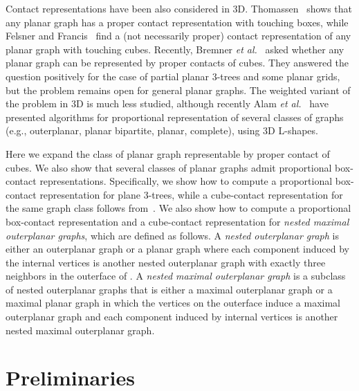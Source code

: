 \documentclass{llncs}
\begin{document}
Contact representations have been also considered in 3D. Thomassen~\cite{Thom88} shows that any planar graph has a proper
 contact representation with touching boxes, while Felsner and Francis~\cite{FF11} find
 a (not necessarily proper) contact representation of any planar graph with touching cubes.
 Recently, Bremner \textit{et al.}~\cite{BEF+12} asked whether any planar graph
 can be represented by proper contacts of cubes. They answered the question positively
 for the case of partial planar 3-trees and some planar grids, but the problem remains
 open for general planar graphs. The weighted variant of the problem
 in 3D is much less studied, although recently Alam \textit{et al.}~\cite{AKLPV14} have
 presented algorithms for proportional representation of several
 classes of graphs (e.g., outerplanar, planar bipartite, planar,
 complete), using 3D L-shapes.







 \smallskip{} Here we expand the class of planar graph representable by proper contact of cubes. We also
 show that several classes of planar graphs admit proportional box-contact representations.
Specifically, we show how to compute a proportional box-contact representation for plane 3-trees, while a cube-contact
 representation for the same graph class follows
 from~\cite{BEF+12}. We also show how to compute a proportional
 box-contact representation and a cube-contact representation for {\em nested maximal outerplanar
   graphs}, which are defined as follows.
A \textit{nested outerplanar graph} is either an outerplanar graph or a planar graph 
 where each component induced by the internal vertices is another nested outerplanar
 graph with exactly three neighbors in the outerface of . A \textit{nested maximal
 outerplanar graph} is a subclass of nested outerplanar graphs
that is either a maximal outerplanar graph or a
 maximal planar graph in which the vertices on the outerface induce a maximal outerplanar
 graph and each component induced by internal vertices is another nested maximal outerplanar
 graph. 













\section{Preliminaries}
\end{document}
